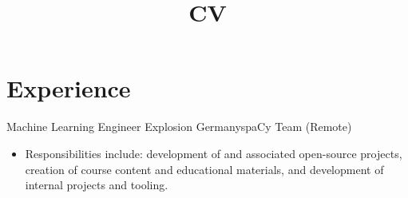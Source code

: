 \documentclass[12pt,a4paper]{moderncv}
\title{CV}
\begin{document}
\maketitle

\section{Experience}

{Machine Learning Engineer}
{Explosion}
{Germany}{spaCy Team (Remote)}
{
    \begin{itemize}
        \item Responsibilities include: development of {\color{blue}
            } and associated open-source
            projects, creation of course content and educational materials, and
            development of internal projects and tooling. 
    \end{itemize}
}
\end{document}
